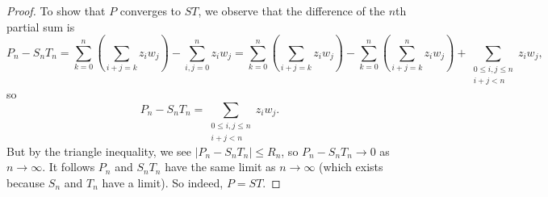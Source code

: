 \documentclass[../notes.tex]{subfiles}
\begin{document}
\begin{proof}
	To show that $P$ converges to $ST$, we observe that the difference of the $n$th partial sum is
	\[P_n-S_nT_n=\sum_{k=0}^n\left(\sum_{i+j=k}z_iw_j\right)-\sum_{i,j=0}^nz_iw_j=\sum_{k=0}^n\left(\sum_{i+j=k}z_iw_j\right)-\sum_{k=0}^n\left(\sum_{i+j=k}^nz_iw_j\right)+\sum_{\substack{0\le i,j\le n\\i+j<n}}z_iw_j,\]
	so
	\[P_n-S_nT_n=\sum_{\substack{0\le i,j\le n\\i+j<n}}z_iw_j.\]
	But by the triangle inequality, we see $|P_n-S_nT_n|\le R_n$, so $P_n-S_nT_n\to0$ as $n\to\infty$. It follows $P_n$ and $S_nT_n$ have the same limit as $n\to\infty$ (which exists because $S_n$ and $T_n$ have a limit). So indeed, $P=ST$.
\end{proof}
\end{document}
